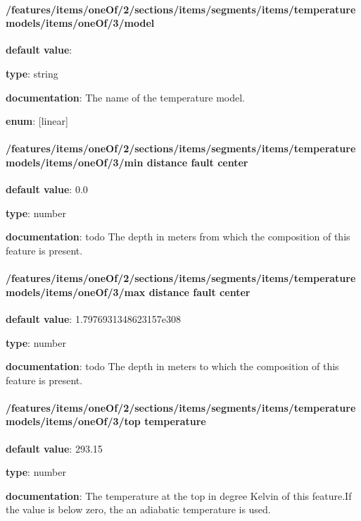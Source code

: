 \paragraph{/features/items/oneOf/2/sections/items/segments/items/temperature models/items/oneOf/3/model} \begin{itemized}
\item {\bf default value}: 
\item {\bf type}: string
\item {\bf documentation}: The name of the temperature model.
\item {\bf enum}: [linear]\end{itemized}\paragraph{/features/items/oneOf/2/sections/items/segments/items/temperature models/items/oneOf/3/min distance fault center} \begin{itemized}
\item {\bf default value}: 0.0
\item {\bf type}: number
\item {\bf documentation}: todo The depth in meters from which the composition of this feature is present.
\end{itemized}\paragraph{/features/items/oneOf/2/sections/items/segments/items/temperature models/items/oneOf/3/max distance fault center} \begin{itemized}
\item {\bf default value}: 1.7976931348623157e308
\item {\bf type}: number
\item {\bf documentation}: todo The depth in meters to which the composition of this feature is present.
\end{itemized}\paragraph{/features/items/oneOf/2/sections/items/segments/items/temperature models/items/oneOf/3/top temperature} \begin{itemized}
\item {\bf default value}: 293.15
\item {\bf type}: number
\item {\bf documentation}: The temperature at the top in degree Kelvin of this feature.If the value is below zero, the an adiabatic temperature is used.

\end{itemized}
